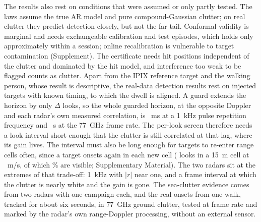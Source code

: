 \documentclass[journal]{IEEEtran}
\begin{document}
The results also rest on conditions that were assumed or only partly tested. The laws assume the true AR model and pure compound-Gaussian clutter; on real clutter they predict detection closely, but not the far tail. Conformal validity is marginal and needs exchangeable calibration and test episodes, which holds only approximately within a session; online recalibration is vulnerable to target contamination (Supplement). The certificate needs hit positions independent of the clutter and dominated by the hit model, and interference too weak to be flagged counts as clutter. Apart from the IPIX reference target and the walking person, whose result is descriptive, the real-data detection results rest on injected targets with known timing, to which the dwell is aligned. A guard extends the horizon by only $\Delta$ looks, so the whole guarded horizon, at the opposite Doppler and each radar's own measured correlation, is \HorizMsPrf~ms at a 1~kHz pulse repetition frequency and \HorizSecFrame~s at the 77~GHz frame rate. The per-look screen therefore needs a look interval short enough that the clutter is still correlated at that lag, where its gain lives. The interval must also be long enough for targets to re-enter range cells often, since a target onsets again in each new cell (\CellLooksRef{} looks in a 15~m cell at \CellSpeedRef~m/s, of which \DutyRef\% are visible; Supplementary Material). The two radars sit at the extremes of that trade-off: 1~kHz with $|r|$ near one, and a frame interval at which the clutter is nearly white and the gain is gone. The sea-clutter evidence comes from two radars with one campaign each, and the real onsets from one walk, tracked for about six seconds, in 77~GHz ground clutter, tested at frame rate and marked by the radar's own range-Doppler processing, without an external sensor.
\end{document}
